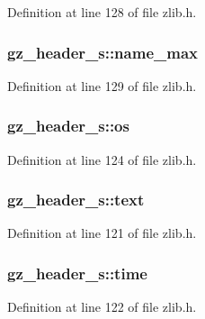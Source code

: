 Definition at line 128 of file zlib.\-h.

\hypertarget{structgz__header__s_af503d267de15a461b81dcbbfb0d628e5}{
\subsubsection[{name\-\_\-max}]{ gz\-\_\-header\-\_\-s\-::name\-\_\-max}}\label{structgz__header__s_af503d267de15a461b81dcbbfb0d628e5}


Definition at line 129 of file zlib.\-h.

\hypertarget{structgz__header__s_a2708d3180d30b0563e3c2c965865cd4f}{
\subsubsection[{os}]{ gz\-\_\-header\-\_\-s\-::os}}\label{structgz__header__s_a2708d3180d30b0563e3c2c965865cd4f}


Definition at line 124 of file zlib.\-h.

\hypertarget{structgz__header__s_af94c3fadfed835a501bc1babc4b894f9}{
\subsubsection[{text}]{ gz\-\_\-header\-\_\-s\-::text}}\label{structgz__header__s_af94c3fadfed835a501bc1babc4b894f9}


Definition at line 121 of file zlib.\-h.

\hypertarget{structgz__header__s_a5f00bb6f9689c1abf7a54dad449ce9d3}{
\subsubsection[{time}]{ gz\-\_\-header\-\_\-s\-::time}}\label{structgz__header__s_a5f00bb6f9689c1abf7a54dad449ce9d3}


Definition at line 122 of file zlib.\-h.

